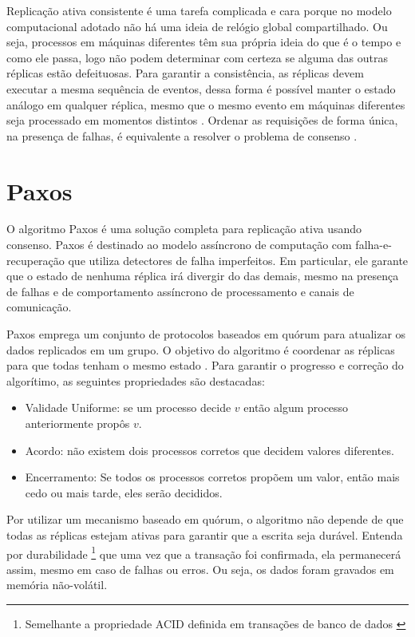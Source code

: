 Replicação ativa consistente é uma tarefa complicada e cara porque no modelo computacional
adotado não há uma ideia de relógio global compartilhado. Ou seja, processos em máquinas
diferentes têm sua própria ideia do que é o tempo e como ele passa, logo não podem
determinar com certeza se alguma das outras réplicas estão defeituosas. Para garantir a
consistência, as réplicas devem executar a mesma sequência de eventos, dessa forma é
possível manter o estado análogo em qualquer réplica, mesmo que o mesmo evento em máquinas
diferentes seja processado em momentos distintos \cite{tanenbaum07}. Ordenar as
requisições de forma única, na presença de falhas, é equivalente a resolver o problema de
consenso \cite{chandra96}.


\section{Paxos}\label{sec:paxos}

O algoritmo Paxos \cite{lamport98} é uma solução completa para replicação ativa usando
consenso. Paxos é destinado ao modelo assíncrono de computação com falha-e-recuperação que
utiliza detectores de falha imperfeitos. Em particular, ele garante que o estado de
nenhuma réplica irá divergir do das demais, mesmo na presença de falhas e de comportamento
assíncrono de processamento e canais de comunicação.

Paxos emprega um conjunto de protocolos baseados em quórum para atualizar os dados
replicados em um grupo. O objetivo do algoritmo é coordenar as réplicas para que todas
tenham o mesmo estado \cite{cachin11}. Para garantir o progresso e correção do algorítimo,
as seguintes propriedades são destacadas:

\begin{itemize}
  \item Validade Uniforme: se um processo decide $v$ então algum processo anteriormente
    propôs $v$.
  \item Acordo: não existem dois processos corretos que decidem valores diferentes.
  \item Encerramento: Se todos os processos corretos propõem um valor, então mais cedo ou
    mais tarde, eles serão decididos.
\end{itemize}

Por utilizar um mecanismo baseado em quórum, o algoritmo não depende de que todas as
réplicas estejam ativas para garantir que a escrita seja durável. Entenda por durabilidade
\footnote{Semelhante a propriedade ACID definida em transações de banco de dados
\cite{haerder83}} que uma vez que a transação foi confirmada, ela permanecerá assim, mesmo
em caso de falhas ou erros. Ou seja, os dados foram gravados em memória não-volátil.

